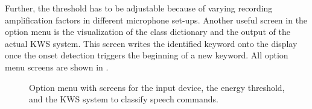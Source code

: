 Further, the threshold has to be adjustable because of varying recording amplification factors in different microphone set-ups.
Another useful screen in the option menu is the visualization of the class dictionary and the output of the actual KWS system.
This screen writes the identified keyword onto the display once the onset detection triggers the beginning of a new keyword.
All option menu screens are shown in .
\begin{figure}[!ht]
  \centering
  \qquad
  \qquad
  \caption{Option menu with screens for the input device, the energy threshold, and the KWS system to classify speech commands.}
  \label{fig:game_design_menu_options}
\end{figure}
\FloatBarrier
\noindent



